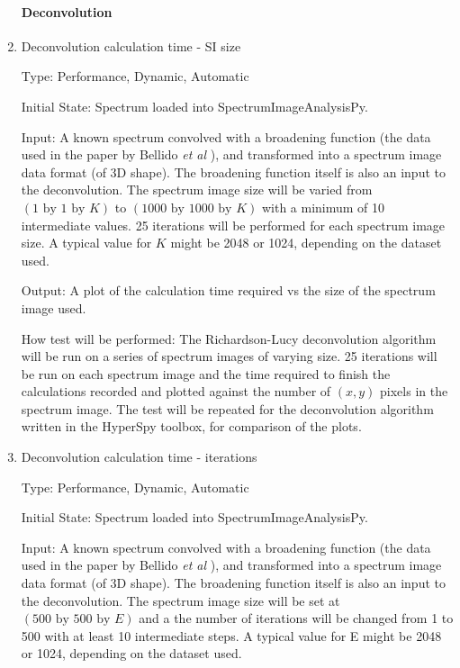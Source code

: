 \documentclass[12pt, titlepage]{article}
\newcommand{\progname}{SpectrumImageAnalysisPy}
\begin{document}
\begin{enumerate}

\paragraph{Deconvolution}
\item{Deconvolution calculation time - SI size}

Type: Performance, Dynamic, Automatic
					
Initial State: Spectrum loaded into \progname{}.

Input: A known spectrum convolved with a broadening function (the data used in
the paper by Bellido \textit{et al} \cite{bellido_toward_2014}), and transformed
into a spectrum image data format (of 3D shape). The broadening
function itself is also an input to the deconvolution. The spectrum image size
will be varied from $(1\text{ by }1\text{ by }K)$ to $(1000 \text{ by } 1000
\text{ by } K)$ with a minimum of 10 intermediate values. 25 iterations will be
performed for each spectrum image size. A typical value for $K$ might be 2048 or
1024, depending on the dataset used.

Output: A plot of the calculation time required vs the size of the spectrum
image used.

How test will be performed: The Richardson-Lucy deconvolution algorithm will be
run on a series of spectrum images of varying size. 25 iterations will be run on
each spectrum image and the time required to finish the calculations recorded
and plotted against the number of $(x, y)$ pixels in the spectrum image. The
test will be repeated for the deconvolution algorithm written in the HyperSpy
toolbox, for comparison of the plots.\\


\item{Deconvolution calculation time - iterations}

Type: Performance, Dynamic, Automatic

Initial State: Spectrum loaded into \progname{}.

Input: A known spectrum convolved with a broadening function (the data used in
the paper by Bellido \textit{et al} \cite{bellido_toward_2014}), and transformed
into a spectrum image data format (of 3D shape). The broadening
function itself is also an input to the deconvolution. The spectrum image size
will be set at $(500 \text{ by } 500 \text{ by } E)$ and a the number of
iterations will be changed from 1 to 500 with at least 10 intermediate steps. A
typical value for E might be 2048 or 1024, depending on the dataset used.


\end{enumerate}
\end{document}
